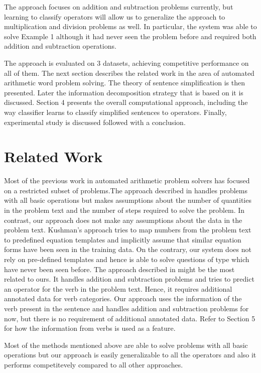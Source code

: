 \documentclass[11pt]{article}
\begin{document}
The approach focuses on addition and subtraction problems currently, but learning to classify operators will allow us to generalize the approach to multiplication and division problems as well. In particular, the system was able to solve Example 1 although it had never seen the problem before and required both addition and subtraction operations.

The approach is evaluated on 3 datasets, achieving competitive performance on all of them. The next section describes the related work in the area of automated arithmetic word problem solving. The theory of sentence simplification is then presented. Later the information decomposition strategy that is based on it is discussed. Section 4 presents the overall computational approach, including the way classifier learns to classify simplified sentences to operators. Finally, experimental study is discussed followed with a conclusion.

\section{Related Work}
Most of the previous work in automated arithmetic problem solvers has focused on a restricted subset of problems.The approach described in \citep{RoyTACL15} handles problems with all basic operations but makes assumptions about the number of quantities in the problem text and the number of steps required to solve the problem. In contrast, our approach does not make any assumptions about the data in the problem text. Kushman's approach \citep{Kushman} tries to map numbers from the problem text to predefined equation templates and implicitly assume that similar equation forms have been seen in the training data. On the contrary, our system does not rely on pre-defined templates and hence is able to solve questions of type which have never been seen before.  The approach described in \citep{ARIS} might be the most related to ours. It handles addition and subtraction problems and tries to predict an operator for the verb in the problem text. Hence, it requires additional annotated data for verb categories. Our approach uses the information of the verb present in the sentence and handles addition and subtraction problems for now, but there is no requirement of additional annotated data. Refer to Section 5 for how the information from verbs is used as a feature. 

Most of the methods mentioned above are able to solve problems with all basic operations but our approach is easily generalizable to all the operators and also it performs competitevely compared to all other approaches. 
\end{document}
